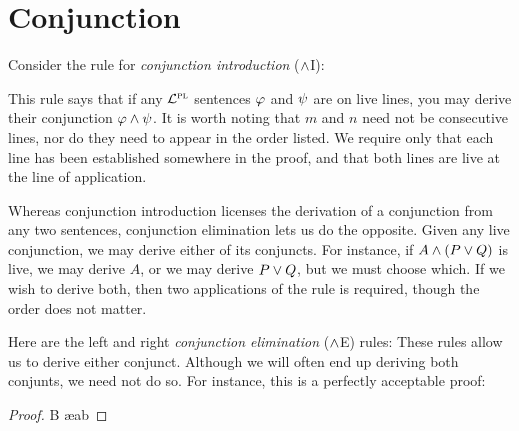 \section{Conjunction}

Consider the rule for \textit{conjunction introduction} ($\wedge$I):


This rule says that if any $\mathcal{L}^{\textsc{pl}}$ sentences $\varphi$ and $\psi$ are on live lines, you may derive their conjunction $\varphi \wedge \psi$.
It is worth noting that $m$ and $n$ need not be consecutive lines, nor do they need to appear in the order listed.
We require only that each line has been established somewhere in the proof, and that both lines are live at the line of application.

Whereas conjunction introduction licenses the derivation of a conjunction from any two sentences, conjunction elimination lets us do the opposite.
Given any live conjunction, we may derive either of its conjuncts.
For instance, if $A \wedge (P \vee Q)$ is live, we may derive $A$, or we may derive $P \vee Q$, but we must choose which.
If we wish to derive both, then two applications of the rule is required, though the order does not matter.

Here are the left and right \textit{conjunction elimination} ($\wedge$E) rules:
These rules allow us to derive either conjunct.
Although we will often end up deriving both conjunts, we need not do so.
For instance, this is a perfectly acceptable proof:

\begin{proof}
	 \pr{}
	B \ae{ab}
\end{proof}

